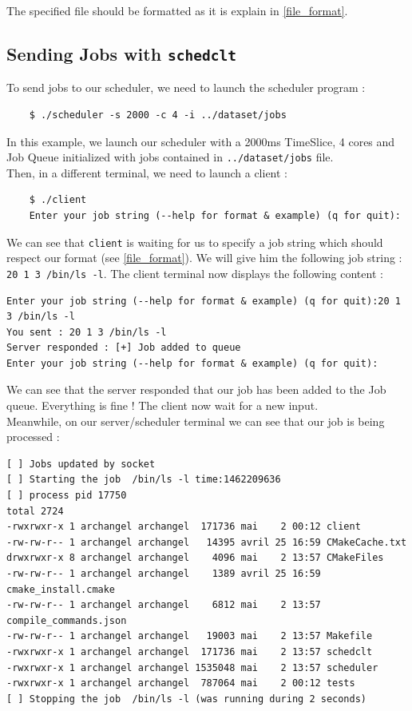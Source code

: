 \documentclass[a4paper,11pt]{article}
\begin{document}
The specified file should be formatted as it is explain in \ref{file_format}.

\subsection{Sending Jobs with \texttt{schedclt}}

To send jobs to our scheduler, we need to launch the scheduler program :

\begin{verbatim}
    $ ./scheduler -s 2000 -c 4 -i ../dataset/jobs
\end{verbatim}

In this example, we launch our scheduler with a 2000ms TimeSlice, 4 cores and Job Queue initialized with jobs contained in \texttt{../dataset/jobs} file.\\

Then, in a different terminal, we need to launch a client :

\begin{verbatim}
    $ ./client
    Enter your job string (--help for format & example) (q for quit):
\end{verbatim}

We can see that \texttt{client} is waiting for us to specify a job string which should respect our format (see \ref{file_format}). We will give him the following job string : \texttt{20 1 3 /bin/ls -l}. The client terminal now displays the following content :

\begin{verbatim}
Enter your job string (--help for format & example) (q for quit):20 1 3 /bin/ls -l
You sent : 20 1 3 /bin/ls -l
Server responded : [+] Job added to queue
Enter your job string (--help for format & example) (q for quit):
\end{verbatim}

We can see that the server responded that our job has been added to the Job queue. Everything is fine ! The client now wait for a new input.\\

Meanwhile, on our server/scheduler terminal we can see that our job is being processed :

\begin{verbatim}
[ ] Jobs updated by socket
[ ] Starting the job  /bin/ls -l time:1462209636
[ ] process pid 17750
total 2724
-rwxrwxr-x 1 archangel archangel  171736 mai    2 00:12 client
-rw-rw-r-- 1 archangel archangel   14395 avril 25 16:59 CMakeCache.txt
drwxrwxr-x 8 archangel archangel    4096 mai    2 13:57 CMakeFiles
-rw-rw-r-- 1 archangel archangel    1389 avril 25 16:59 cmake_install.cmake
-rw-rw-r-- 1 archangel archangel    6812 mai    2 13:57 compile_commands.json
-rw-rw-r-- 1 archangel archangel   19003 mai    2 13:57 Makefile
-rwxrwxr-x 1 archangel archangel  171736 mai    2 13:57 schedclt
-rwxrwxr-x 1 archangel archangel 1535048 mai    2 13:57 scheduler
-rwxrwxr-x 1 archangel archangel  787064 mai    2 00:12 tests
[ ] Stopping the job  /bin/ls -l (was running during 2 seconds)
\end{verbatim}
\end{document}
